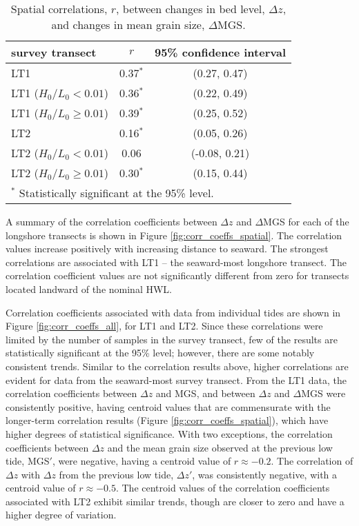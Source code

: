 \documentclass[jmse,article,submit,pdftex,moreauthors]{Definitions/mdpi}
\begin{document}
\begin{table}[tbp!]
	\caption[Spatial correlations between changes in bed level and changes in mean grain size]{Spatial correlations, $r$, between changes in bed level, $\Delta z$, and changes in mean grain size, $\Delta$MGS.} 
	\label{table:spatial_correlations}
	\centering
	\begin{tabular}{lcc}
		\hline
		survey transect & $r$ & 95\% confidence interval\\
		\hline
		LT1 & 0.37$^{*}$ & (0.27, 0.47)\\
		LT1 ($H_0/L_0 < 0.01$) & 0.36$^{*}$ & (0.22, 0.49)\\
		LT1 ($H_0/L_0 \ge 0.01$) & 0.39$^{*}$ & (0.25, 0.52)\\
		LT2 & 0.16$^{*}$ & (0.05, 0.26)\\
		LT2 ($H_0/L_0 < 0.01$) & 0.06 & (-0.08, 0.21)\\
		LT2 ($H_0/L_0 \ge 0.01$) & 0.30$^{*}$ & (0.15, 0.44)\\
		\hline
		\multicolumn{3}{l}{$^{*}$ Statistically significant at the 95\% level.}
	\end{tabular}
\end{table}

A summary of the correlation coefficients between $\Delta z$ and $\Delta$MGS for each of the longshore transects is shown in Figure \ref{fig:corr_coeffs_spatial}. The correlation values increase positively with increasing distance to seaward. The strongest correlations are associated with LT1 -- the seaward-most longshore transect. The correlation coefficient values are not significantly different from zero for transects located landward of the nominal HWL.

Correlation coefficients associated with data from individual tides are shown in Figure \ref{fig:corr_coeffs_all}, for LT1 and LT2. Since these correlations were limited by the number of samples in the survey transect, few of the results are statistically significant at the 95\% level; however, there are some notably consistent trends. Similar to the correlation results above, higher correlations are evident for data from the seaward-most survey transect. From the LT1 data, the correlation coefficients between $\Delta z$ and MGS, and between $\Delta z$ and $\Delta$MGS were consistently positive, having centroid values that are commensurate with the longer-term correlation results (Figure \ref{fig:corr_coeffs_spatial}), which have higher degrees of statistical significance. With two exceptions, the correlation coefficients between $\Delta z$ and the mean grain size observed at the previous low tide, MGS$'$, were negative, having a centroid value of $r\approx -0.2$. The correlation of $\Delta z$ with $\Delta z$ from the previous low tide, $\Delta z'$, was consistently negative, with a centroid value of $r\approx -0.5$. The centroid values of the correlation coefficients associated with LT2 exhibit similar trends, though are closer to zero and have a higher degree of variation. 
\end{document}
